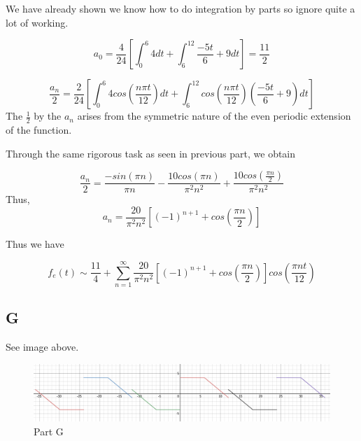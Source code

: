 \documentclass{article}
\begin{document}
We have already shown we know how to do integration by parts so ignore quite a lot of working.

$$
a_0 = \frac{4}{24} \left[ \int_0^6 4 dt + \int_6^{12} \frac{-5t}{6} + 9 dt \right] = \frac{11}{2}
$$

$$
\frac{a_n}{2} = \frac{2}{24} \left[ \int_0^{6} 4 cos\left( \frac{n \pi t}{12} \right) dt + \int_6^{12} cos\left(\frac{n \pi t}{12}\right)\left(\frac{-5t}{6}+9\right)dt\right]
$$
The $\frac{1}{2}$ by the $a_n$ arises from the symmetric nature of the even periodic extension of the function.

Through the same rigorous task as seen in previous part, we obtain

$$
\frac{a_n}{2} = \frac{-sin(\pi n)}{\pi n} - \frac{10cos(\pi n)}{\pi^2 n^2} + \frac{10cos(\frac{\pi n}{2})}{\pi^2 n^2}
$$
Thus,
$$
a_n =\frac{20}{\pi^2n^2} \left[ \left(-1\right)^{n+1} +cos\left(\frac{\pi n}{2}\right) \right]
$$

Thus we have

$$
f_e(t) \sim \frac{11}{4} + \sum_{n=1}^{\infty} \frac{20}{\pi^2n^2} \left[ \left(-1\right)^{n+1} +cos\left(\frac{\pi n}{2}\right) \right] cos\left(\frac{\pi n t}{12}\right)
$$

\subsection*{G}

See image above.

\begin{figure}
\centering
\includegraphics[width=1.0\textwidth]{./static/graph5.png}
\caption{Part G}
\end{figure}
\end{document}
